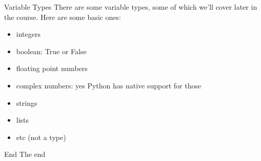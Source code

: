 \begin{frame}{Variable Types}
    There are some variable types, some of which we'll cover later in the course. Here are some basic ones:
    \begin{itemize}
        \item integers
        \item boolean: True or False
        \item floating point numbers
        \item complex numbers: yes Python has native support for those
        \item strings
        \item lists
        \item etc (not a type)
    \end{itemize}
\end{frame}

\begin{frame}[standout]{End}
  The end
\end{frame}


